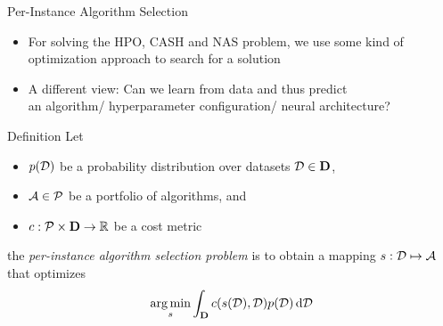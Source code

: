 \begin{frame}[c]{Per-Instance Algorithm Selection}

\begin{itemize}
	\item For solving the HPO, CASH and NAS problem, we use some kind of optimization approach to \alert{search} for a solution
	\pause
	\item A different view: Can we learn from data and thus \alert{predict}\\ an algorithm/ hyperparameter configuration/ neural architecture?
\end{itemize}

\pause
\begin{block}{Definition}
	Let 
	\begin{itemize}
		\item $p(\mathcal{D})$ be a probability \alert{distribution} over datasets $\mathcal{D} \in \mathbf{D}$,
		\pause
		\item $\mathcal{A} \in \mathcal{P}$ be a portfolio of algorithms, and
		\pause
		\item $c: \mathcal{P} \times \mathbf{D} \rightarrow \mathbb{R}$ be a cost metric   
	\end{itemize}
	
	\pause
	the \emph{per-instance algorithm selection problem} is to obtain a mapping 
	$s: \mathcal{D} \mapsto \mathcal{A}$ 
	that optimizes 
	$$\operatorname*{arg\,min}_{s} \int_{\mathbf{D}} c(s(\mathcal{D}),\mathcal{D}) p(\mathcal{D}) \mathop{}\!\mathrm{d}\mathcal{D}$$
\end{block}

\end{frame}
